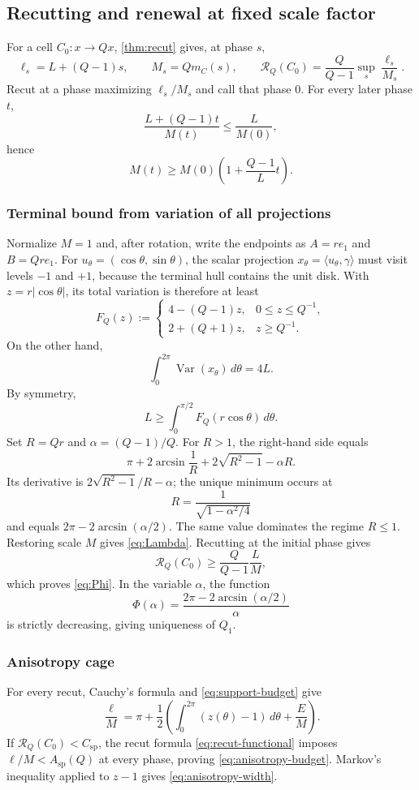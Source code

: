 \documentclass[10pt,a4paper]{article}
\theoremstyle{definition}
\theoremstyle{remark}
\newcommand{\abs}[1]{\lvert #1\rvert}
\newcommand{\ip}[2]{\langle #1,#2\rangle}
\newcommand{\cellratio}{\mathcal{R}}
\newcommand{\spc}{C_{\mathrm{sp}}}
\begin{document}
\subsection{Recutting and renewal at fixed scale factor}
For a cell $C_0:x\to Qx$, \cref{thm:recut} gives, at phase $s$,
\[
\ell_s=L+(Q-1)s,
\qquad
M_s=Qm_C(s),
\qquad
\cellratio_Q(C_0)=\frac{Q}{Q-1}\sup_s\frac{\ell_s}{M_s}.
\]
Recut at a phase maximizing $\ell_s/M_s$ and call that phase $0$. For every later phase $t$,
\[
\frac{L+(Q-1)t}{M(t)}\le\frac{L}{M(0)},
\]
hence
\begin{equation}
M(t)\ge M(0)\left(1+\frac{Q-1}{L}t\right).
\label{eq:recut-barrier}
\end{equation}

\subsubsection{Terminal bound from variation of all projections}
Normalize $M=1$ and, after rotation, write the endpoints as $A=re_1$ and $B=Qre_1$. For $u_\theta=(\cos\theta,\sin\theta)$, the scalar projection $x_\theta=\ip{u_\theta}{\gamma}$ must visit levels $-1$ and $+1$, because the terminal hull contains the unit disk. With $z=r\abs{\cos\theta}$, its total variation is therefore at least
\begin{equation}
F_Q(z):=
\begin{cases}
4-(Q-1)z,&0\le z\le Q^{-1},\\
2+(Q+1)z,&z\ge Q^{-1}.
\end{cases}
\label{eq:FQ}
\end{equation}
On the other hand,
\[
\int_0^{2\pi}\operatorname{Var}(x_\theta)\,d\theta=4L.
\]
By symmetry,
\[
L\ge\int_0^{\pi/2}F_Q(r\cos\theta)\,d\theta.
\]
Set $R=Qr$ and $\alpha=(Q-1)/Q$. For $R>1$, the right-hand side equals
\[
\pi+2\arcsin\frac1R+2\sqrt{R^2-1}-\alpha R.
\]
Its derivative is $2\sqrt{R^2-1}/R-\alpha$; the unique minimum occurs at
\[
R=\frac{1}{\sqrt{1-\alpha^2/4}}
\]
and equals $2\pi-2\arcsin(\alpha/2)$. The same value dominates the regime $R\le1$. Restoring scale $M$ gives \eqref{eq:Lambda}. Recutting at the initial phase gives
\[
\cellratio_Q(C_0)\ge\frac{Q}{Q-1}\frac{L}{M},
\]
which proves \eqref{eq:Phi}. In the variable $\alpha$, the function
\[
\Phi(\alpha)=\frac{2\pi-2\arcsin(\alpha/2)}{\alpha}
\]
is strictly decreasing, giving uniqueness of $Q_1$.

\subsubsection{Anisotropy cage}
For every recut, Cauchy's formula and \eqref{eq:support-budget} give
\begin{equation}
\frac{\ell}{M}
=\pi+\frac12\left(
\int_0^{2\pi}(z(\theta)-1)\,d\theta+\frac{E}{M}
\right).
\label{eq:anisotropy-identity}
\end{equation}
If $\cellratio_Q(C_0)<\spc$, the recut formula \eqref{eq:recut-functional} imposes $\ell/M<A_{\mathrm{sp}}(Q)$ at every phase, proving \eqref{eq:anisotropy-budget}. Markov's inequality applied to $z-1$ gives \eqref{eq:anisotropy-width}.
\end{document}
